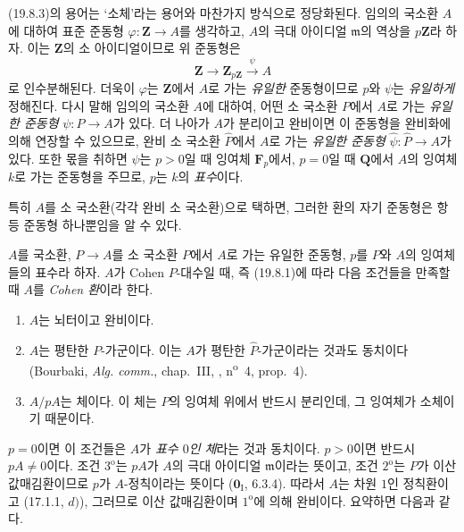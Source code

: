 (19.8.3)의 용어는 ‘소체’라는 용어와 마찬가지 방식으로
정당화된다. 임의의 국소환 $A$에 대하여 표준 준동형
$\varphi:\mathbf Z\to A$를 생각하고, $A$의 극대 아이디얼
$\mathfrak m$의 역상을 $p\mathbf Z$라 하자. 이는 $\mathbf Z$의
소 아이디얼이므로 위 준동형은
\[
  \mathbf Z\longrightarrow\mathbf Z_{p\mathbf Z}
  \xrightarrow{\psi}A
\]
로 인수분해된다. 더욱이 $\varphi$는 $\mathbf Z$에서 $A$로 가는
\emph{유일한} 준동형이므로 $p$와 $\psi$는 \emph{유일하게}
정해진다. 다시 말해 임의의 국소환 $A$에 대하여, 어떤 소 국소환
$P$에서 $A$로 가는 \emph{유일한 준동형} $\psi:P\to A$가 있다.
더 나아가 $A$가 분리이고 완비이면 이 준동형을 완비화에 의해
연장할 수 있으므로, 완비 소 국소환 $\widehat P$에서 $A$로 가는
\emph{유일한 준동형}
$\widehat\psi:\widehat P\to A$가 있다. 또한 몫을 취하면 $\psi$는
$p>0$일 때 잉여체 $\mathbf F_p$에서, $p=0$일 때 $\mathbf Q$에서
$A$의 잉여체 $k$로 가는 준동형을 주므로, $p$는 $k$의
\emph{표수}이다.

특히 $A$를 소 국소환(각각 완비 소 국소환)으로 택하면, 그러한 환의
자기 준동형은 항등 준동형 하나뿐임을 알 수 있다.


\begin{definition}[19.8.4]
\label{0.19.8.4-ko}
$A$를 국소환, $P\to A$를 소 국소환 $P$에서 $A$로 가는 유일한
준동형, $p$를 $P$와 $A$의 잉여체들의 표수라 하자. $A$가 Cohen
$P$-대수일 때, 즉 (19.8.1)에 따라 다음 조건들을 만족할 때 $A$를
\emph{Cohen 환}이라 한다.
\begin{enumerate}
  \item[$1^{\mathrm o}$] $A$는 뇌터이고 완비이다.
  \item[$2^{\mathrm o}$] $A$는 평탄한 $P$-가군이다. 이는 $A$가
  평탄한 $\widehat P$-가군이라는 것과도 동치이다 (Bourbaki,
  \emph{Alg. comm.}, chap.~III, ,
  n\textsuperscript{o}~4, prop.~4).
  \item[$3^{\mathrm o}$] $A/pA$는 체이다. 이 체는 $P$의 잉여체
  위에서 반드시 분리인데, 그 잉여체가 소체이기 때문이다.
\end{enumerate}
\end{definition}

$p=0$이면 이 조건들은 $A$가 \emph{표수 $0$인 체}라는 것과
동치이다. $p>0$이면 반드시 $pA\neq0$이다. 조건
$3^{\mathrm o}$는 $pA$가 $A$의 극대 아이디얼 $\mathfrak m$이라는
뜻이고, 조건 $2^{\mathrm o}$는 $P$가 이산 값매김환이므로
$p$가 $A$-정칙이라는 뜻이다 ($\mathbf 0_{\mathrm I}$, 6.3.4).
따라서 $A$는 차원 $1$인 정칙환이고 (17.1.1, $d)$), 그러므로
이산 값매김환이며 $1^{\mathrm o}$에 의해 완비이다. 요약하면 다음과
같다.

